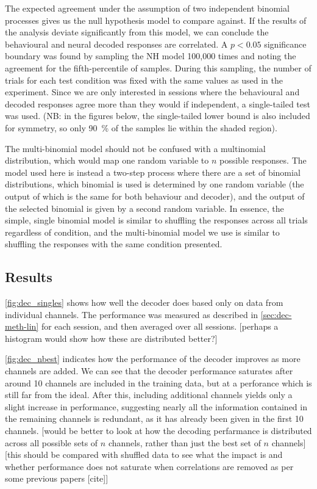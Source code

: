 The expected agreement under the assumption of two independent binomial processes gives us the null hypothesis model to compare against.
If the results of the analysis deviate significantly from this model, we can conclude the behavioural and neural decoded responses are correlated.
A $p<0.05$ significance boundary was found by sampling the NH model 100,000 times and noting the agreement for the fifth-percentile of samples.
During this sampling, the number of trials for each test condition was fixed with the same values as used in the experiment.
Since we are only interested in sessions where the behavioural and decoded responses agree more than they would if independent, a single-tailed test was used.
(NB: in the figures below, the single-tailed lower bound is also included for symmetry, so only \SI{90}{\percent} of the samples lie within the shaded region).

The multi-binomial model should not be confused with a multinomial distribution, which would map one random variable to $n$ possible responses.
The model used here is instead a two-step process where there are a set of binomial distributions, which binomial is used is determined by one random variable (the output of which is the same for both behaviour and decoder), and the output of the selected binomial is given by a second random variable.
In essence, the simple, single binomial model is similar to shuffling the responses across all trials regardless of condition, and the multi-binomial model we use is similar to shuffling the responses with the same condition presented.

\subsection{Results}

\autoref{fig:dec_singles} shows how well the decoder does based only on data from individual channels.
The performance was measured as described in \autoref{sec:dec-meth-lin} for each session, and then averaged over all sessions.
[perhaps a histogram would show how these are distributed better?]

\autoref{fig:dec_nbest} indicates how the performance of the decoder improves as more channels are added.
We can see that the decoder performance saturates after around 10 channels are included in the training data, but at a perforance which is still far from the ideal.
After this, including additional channels yields only a slight increase in performance, suggesting nearly all the information contained in the remaining channels is redundant, as it has already been given in the first 10 channels.
[would be better to look at how the decoding perfarmance is distributed across all possible sets of $n$ channels, rather than just the best set of $n$ channels] [this should be compared with shuffled data to see what the impact is and whether performance does not saturate when correlations are removed as per some previous papers [cite]]

